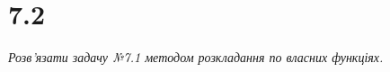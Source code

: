 

%


\section[Задача №7.2]{7.2}

\textit{Розв’язати задачу №7.1 методом розкладання по власних функціях.}

%